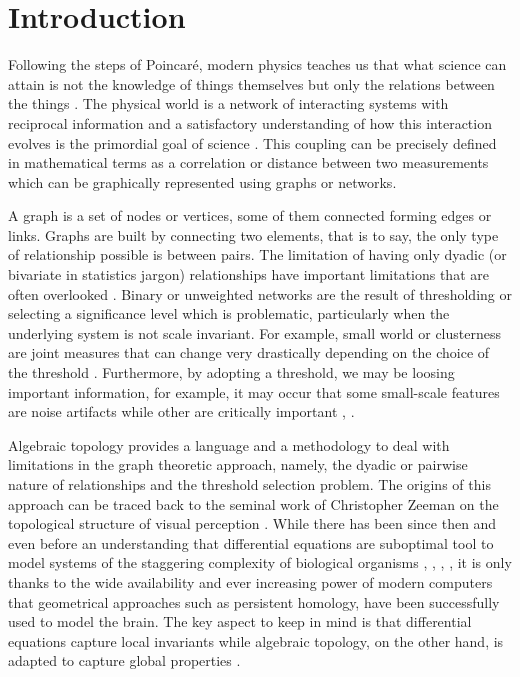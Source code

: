 \documentclass[onecollarge,runningheads]{svjour2}
\begin{document}
\section{Introduction}
Following the steps of Poincar{\'e}, modern physics teaches us that what science can attain is not the knowledge of things themselves but only the relations between the things \cite{Poincare:1952}. The physical world is a network of interacting systems with reciprocal information and a satisfactory understanding of how this interaction evolves is the primordial goal of science \cite{rovelli2015relative}.
This coupling can be precisely defined in mathematical terms as a correlation or distance between two measurements which can be graphically represented using graphs or networks.

A graph is a set of nodes or vertices, some of them connected forming edges or links. Graphs are built by connecting two elements, that is to say, the only type of relationship possible is between pairs. The limitation of having only dyadic (or bivariate in statistics jargon) relationships have important limitations that are often overlooked \cite{giusti2016two}.
Binary or unweighted networks are the result of thresholding or selecting a significance level which is problematic, particularly when the underlying system is not scale invariant. For example, small world or clusterness are joint measures that can change very drastically depending on the choice of the threshold \cite{toppi2012statistical}. Furthermore, by adopting a threshold, we may be loosing important information, for example, it may occur that some small-scale features are noise artifacts while other are critically important \cite{fallani2014graph}, \cite{papo2014complex}.

Algebraic topology \cite{munkres1984elements} provides a language and a methodology to deal with limitations in the graph theoretic approach, namely, the dyadic or pairwise nature of relationships and the threshold selection problem. 
The origins of this approach can be traced back to the seminal work of Christopher Zeeman on the topological structure of visual perception \cite{zeeman:1962}. While there has been since then and even before an understanding that differential equations are suboptimal tool to model systems of the staggering complexity of biological organisms \cite{rosen1958representation}, \cite{Anderson:1972}, \cite{wolkenhauer2001systems}, \cite{boogerd_all_2007}, it is only thanks to the wide availability and ever increasing power of modern computers that geometrical approaches such as persistent homology, have been successfully used to model the brain. The key aspect to keep in mind is that differential equations capture local invariants while algebraic topology, on the other hand, is adapted to capture global properties \cite{hoffman1966lie}. 
\end{document}
